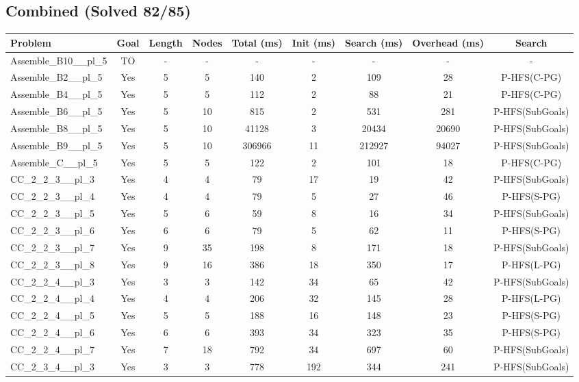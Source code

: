 \documentclass{article}
\begin{document}
\subsection*{Combined (Solved 82/85)}
\begin{tabular}{lcccccccc}
\toprule
Problem & Goal & Length & Nodes & Total (ms) & Init (ms) & Search (ms) & Overhead (ms) & Search \\
\midrule
Assemble\_B10\_\_pl\_5 & TO & - & - & - & - & - & - & - \\
Assemble\_B2\_\_pl\_5 & Yes & 5 & 5 & 140 & 2 & 109 & 28 & P-HFS(C-PG) \\
Assemble\_B4\_\_pl\_5 & Yes & 5 & 5 & 112 & 2 & 88 & 21 & P-HFS(C-PG) \\
Assemble\_B6\_\_pl\_5 & Yes & 5 & 10 & 815 & 2 & 531 & 281 & P-HFS(SubGoals) \\
Assemble\_B8\_\_pl\_5 & Yes & 5 & 10 & 41128 & 3 & 20434 & 20690 & P-HFS(SubGoals) \\
Assemble\_B9\_\_pl\_5 & Yes & 5 & 10 & 306966 & 11 & 212927 & 94027 & P-HFS(SubGoals) \\
Assemble\_C\_\_pl\_5 & Yes & 5 & 5 & 122 & 2 & 101 & 18 & P-HFS(C-PG) \\
CC\_2\_2\_3\_\_pl\_3 & Yes & 4 & 4 & 79 & 17 & 19 & 42 & P-HFS(SubGoals) \\
CC\_2\_2\_3\_\_pl\_4 & Yes & 4 & 4 & 79 & 5 & 27 & 46 & P-HFS(S-PG) \\
CC\_2\_2\_3\_\_pl\_5 & Yes & 5 & 6 & 59 & 8 & 16 & 34 & P-HFS(SubGoals) \\
CC\_2\_2\_3\_\_pl\_6 & Yes & 6 & 6 & 79 & 5 & 62 & 11 & P-HFS(S-PG) \\
CC\_2\_2\_3\_\_pl\_7 & Yes & 9 & 35 & 198 & 8 & 171 & 18 & P-HFS(SubGoals) \\
CC\_2\_2\_3\_\_pl\_8 & Yes & 9 & 16 & 386 & 18 & 350 & 17 & P-HFS(L-PG) \\
CC\_2\_2\_4\_\_pl\_3 & Yes & 3 & 3 & 142 & 34 & 65 & 42 & P-HFS(SubGoals) \\
CC\_2\_2\_4\_\_pl\_4 & Yes & 4 & 4 & 206 & 32 & 145 & 28 & P-HFS(L-PG) \\
CC\_2\_2\_4\_\_pl\_5 & Yes & 5 & 5 & 188 & 16 & 148 & 23 & P-HFS(S-PG) \\
CC\_2\_2\_4\_\_pl\_6 & Yes & 6 & 6 & 393 & 34 & 323 & 35 & P-HFS(S-PG) \\
CC\_2\_2\_4\_\_pl\_7 & Yes & 7 & 18 & 792 & 34 & 697 & 60 & P-HFS(SubGoals) \\
CC\_2\_3\_4\_\_pl\_3 & Yes & 3 & 3 & 778 & 192 & 344 & 241 & P-HFS(SubGoals) \\

\end{tabular}
\end{document}
